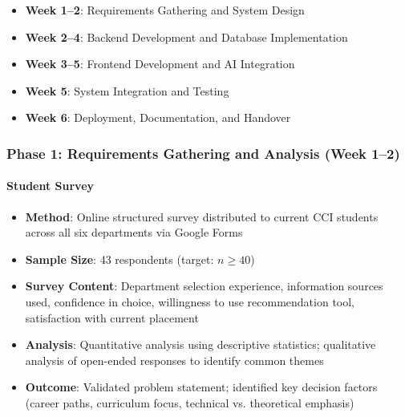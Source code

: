 \documentclass[12pt, a4paper]{article}
\begin{document}
\begin{itemize}[leftmargin=1.5em, itemsep=3pt]
    \item \textbf{Week 1--2}: Requirements Gathering and System Design
    \item \textbf{Week 2--4}: Backend Development and Database Implementation
    \item \textbf{Week 3--5}: Frontend Development and AI Integration
    \item \textbf{Week 5}: System Integration and Testing
    \item \textbf{Week 6}: Deployment, Documentation, and Handover
\end{itemize}

\subsubsection*{Phase 1: Requirements Gathering and Analysis (Week 1--2)}

\paragraph{Student Survey}
\begin{itemize}[leftmargin=1.5em, itemsep=3pt]
    \item \textbf{Method}: Online structured survey distributed to current CCI students across all six departments via Google Forms
    \item \textbf{Sample Size}: 43 respondents (target: $n \geq 40$)
    \item \textbf{Survey Content}: Department selection experience, information sources used, confidence in choice, willingness to use recommendation tool, satisfaction with current placement
    \item \textbf{Analysis}: Quantitative analysis using descriptive statistics; qualitative analysis of open-ended responses to identify common themes
    \item \textbf{Outcome}: Validated problem statement; identified key decision factors (career paths, curriculum focus, technical vs. theoretical emphasis)
\end{itemize}
\end{document}
